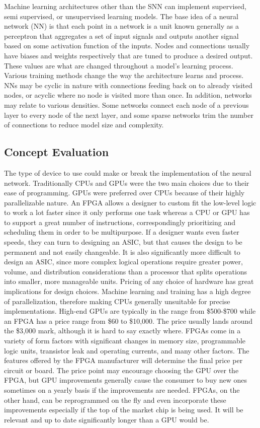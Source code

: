 \documentclass[12pt,titlepage]{article}
\begin{document}
Machine learning architectures other than the SNN can implement supervised, semi supervised, or unsupervised learning models. The base idea of a neural
network (NN) is that each point in a network is a unit known generally as a perceptron that aggregates a set of input signals and outputs another signal
based on some activation function of the inputs. Nodes and connections usually have biases and weights respectively that are tuned to produce a desired
output. These values are what are changed throughout a model’s learning process. Various training methods change the way the architecture learns and
process. NNs may be cyclic in nature with connections feeding back on to already visited nodes, or acyclic where no node is visited more than once.
In addition, networks may relate to various densities. Some networks connect each node of a previous layer to every node of the next layer, and some
sparse networks trim the number of connections to reduce model size and complexity. 

\subsection{Concept Evaluation}
The type of device to use could make or break the implementation of the neural network. Traditionally CPUs and GPUs were the two main choices due
to their ease of programming. GPUs were preferred over CPUs because of their highly parallelizable nature. An FPGA allows a designer to custom fit
the low-level logic to work a lot faster since it only performs one task whereas a CPU or GPU has to support a great number of instructions,
correspondingly prioritizing and scheduling them in order to be multipurpose. If a designer wants even faster speeds, they can turn to designing
an ASIC, but that causes the design to be permanent and not easily changeable. It is also significantly more difficult to design an ASIC, since more
complex logical operations require greater power, volume, and distribution considerations than a processor that splits operations into smaller, more
manageable units. Pricing of any choice of hardware has great implications for design choices. Machine learning and training has a high degree of
parallelization, therefore making CPUs generally unsuitable for precise implementations. High-end GPUs are typically in the range from \$500-\$700
while an FPGA has a price range from \$60 to \$10,000. The price usually lands around the \$3,000 mark, although it is hard to say exactly where.
FPGAs come in a variety of form factors with significant changes in memory size, programmable logic units, transistor leak and operating currents,
and many other factors. The features offered by the FPGA manufacturer will determine the final price per circuit or board. The price point may encourage
choosing the GPU over the FPGA, but GPU improvements generally cause the consumer to buy new ones sometimes on a yearly basis if the improvements are
needed. FPGAs, on the other hand, can be reprogrammed on the fly and even incorporate these improvements especially if the top of the market chip is
being used. It will be relevant and up to date significantly longer than a GPU would be.
\end{document}
